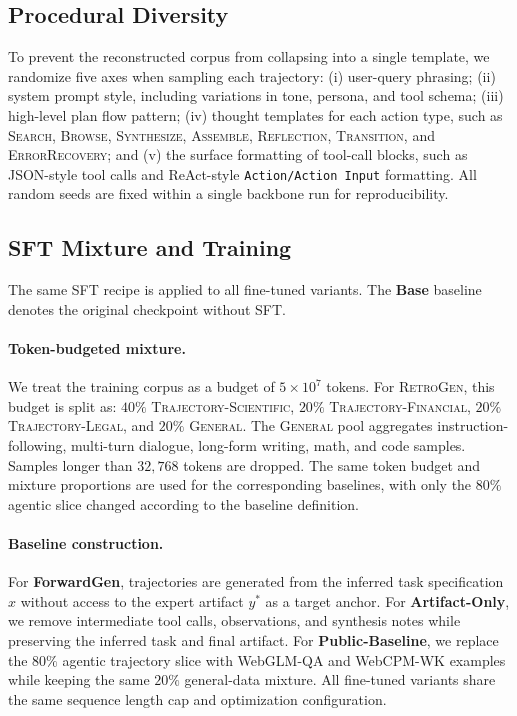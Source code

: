 \subsection{Procedural Diversity}
\label{app:diversity}

To prevent the reconstructed corpus from collapsing into a single
template, we randomize five axes when sampling each trajectory:
(i) user-query phrasing;
(ii) system prompt style, including variations in tone, persona, and
tool schema;
(iii) high-level plan flow pattern;
(iv) thought templates for each action type, such as \textsc{Search},
\textsc{Browse}, \textsc{Synthesize}, \textsc{Assemble},
\textsc{Reflection}, \textsc{Transition}, and \textsc{ErrorRecovery};
and (v) the surface formatting of tool-call blocks, such as JSON-style
tool calls and ReAct-style \texttt{Action/Action Input} formatting. All
random seeds are fixed within a single backbone run for reproducibility.

\subsection{SFT Mixture and Training}
\label{app:sft}

The same SFT recipe is applied to all fine-tuned variants. The
\textbf{Base} baseline denotes the original checkpoint without SFT.

\paragraph{Token-budgeted mixture.}
We treat the training corpus as a budget of $5\times10^{7}$ tokens. For
\textsc{RetroGen}, this budget is split as:
$40\%$ \textsc{Trajectory-Scientific},
$20\%$ \textsc{Trajectory-Financial},
$20\%$ \textsc{Trajectory-Legal}, and
$20\%$ \textsc{General}. The \textsc{General} pool aggregates
instruction-following, multi-turn dialogue, long-form writing, math,
and code samples. Samples longer than $32{,}768$ tokens are dropped.
The same token budget and mixture proportions are used for the
corresponding baselines, with only the $80\%$ agentic slice changed
according to the baseline definition.

\paragraph{Baseline construction.}
For \textbf{ForwardGen}, trajectories are generated from the inferred
task specification $\hat{x}$ without access to the expert artifact
$y^\ast$ as a target anchor. For \textbf{Artifact-Only}, we remove
intermediate tool calls, observations, and synthesis notes while
preserving the inferred task and final artifact. For
\textbf{Public-Baseline}, we replace the $80\%$ agentic trajectory
slice with WebGLM-QA and WebCPM-WK examples while keeping the same
$20\%$ general-data mixture. All fine-tuned variants share the same
sequence length cap and optimization configuration.

